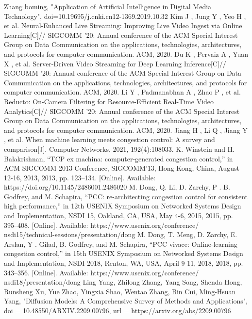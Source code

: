 \documentclass[conference]{IEEEtran}
\begin{document}
\begin{thebibliography}{00}
 Zhang boming, "Application of Artificial Intelligence in Digital Media Technology", doi={10.19695/j.cnki.cn12-1369.2019.10.32}
 Kim J , Jung Y , Yeo H , et al. Neural-Enhanced Live Streaming: Improving Live Video Ingest via Online Learning[C]// SIGCOMM '20: Annual conference of the ACM Special Interest Group on Data Communication on the applications, technologies, architectures, and protocols for computer communication. ACM, 2020.
 Du K , Pervaiz A , Yuan X , et al. Server-Driven Video Streaming for Deep Learning Inference[C]// SIGCOMM '20: Annual conference of the ACM Special Interest Group on Data Communication on the applications, technologies, architectures, and protocols for computer communication. ACM, 2020.
 Li Y , Padmanabhan A , Zhao P , et al. Reducto: On-Camera Filtering for Resource-Efficient Real-Time Video Analytics[C]// SIGCOMM '20: Annual conference of the ACM Special Interest Group on Data Communication on the applications, technologies, architectures, and protocols for computer communication. ACM, 2020.
 Jiang H , Li Q , Jiang Y , et al. When machine learning meets congestion control: A survey and comparison[J]. Computer Networks, 2021, 192(4):108033.
 K. Winstein and H. Balakrishnan, “TCP ex machina: computer-generated congestion control,” in ACM SIGCOMM 2013 Conference, SIGCOMM’13, Hong Kong, China, August 12-16, 2013, 2013, pp. 123–134. [Online]. Available: https://doi.org/10.1145/2486001.2486020
 M. Dong, Q. Li, D. Zarchy, P . B. Godfrey, and M. Schapira, “PCC:
re-architecting congestion control for consistent high performance,”
in 12th USENIX Symposium on Networked Systems Design and
Implementation, NSDI 15, Oakland, CA, USA, May 4-6, 2015, 2015,
pp. 395–408. [Online]. Available: https://www.usenix.org/conference/
nsdi15/technical-sessions/presentation/dong
 M. Dong, T. Meng, D. Zarchy, E. Arslan, Y . Gilad, B. Godfrey,
and M. Schapira, “PCC vivace: Online-learning congestion control,”
in 15th USENIX Symposium on Networked Systems Design and
Implementation, NSDI 2018, Renton, WA, USA, April 9-11, 2018, 2018,
pp. 343–356. [Online]. Available: https://www.usenix.org/conference/
nsdi18/presentation/dong
 Ling Yang, Zhilong Zhang, Yang Song, Shenda Hong, Runsheng Xu, Yue Zhao, Yingxia Shao, Wentao Zhang, Bin Cui, Ming-Hsuan Yang, "Diffusion Models: A Comprehensive Survey of Methods and Applications", doi = 10.48550/ARXIV.2209.00796, url = {https://arxiv.org/abs/2209.00796}

\end{thebibliography}
\vspace{12pt}
\end{document}
